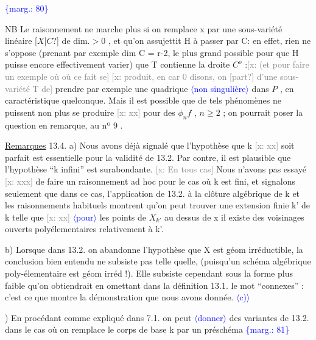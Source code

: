 \documentclass[11pt]{article}
\newcommand{\scanpage}[1]{\par\bigskip\noindent{\small\sffamily[scan #1]}\par}
\newcommand{\mspage}[1]{{\small\sffamily[p.\,#1]}}
\newcommand{\hand}[1]{\textcolor{blue}{#1}}
\let\over\relax
\newcommand{\over}[2]{\textcolor{gray}{#1}\textcolor{blue}{\ensuremath{^{\!\nearrow}}#2}}
\newcommand{\inserted}[2][]{\textcolor{blue}{$\langle$#2$\rangle$}}
\newcommand{\margin}[1]{\textcolor{blue}{\{\textsf{marg.:} #1\}}}
\newcommand{\xout}[1]{\textcolor{gray}{[\textsf{x:} #1]}}
\newcommand{\uline}[1]{\underline{#1}}
\newcommand{\unsure}[1]{[#1?]}
\begin{document}
\margin{80}

\clearpage
\scanpage{25/81}
\mspage{\hand{76}}

NB \quad Le raisonnement ne marche plus si on remplace x par une
sous-variété linéaire \unsure{$X$|$C$} de dim.$>0$ , et qu'on assujettit H à passer
par C: en effet, rien ne s'oppose (prenant par exemple dim C = r-2, le
plus grand possible pour que H puisse encore effectivement varier) que
T contienne la droite $C^{o}$ :\xout{(et pour faire un exemple où où ce fait se}
\xout{produit, en car 0 disons, on \unsure{part} d'une sous-variété T de} prendre par
exemple une quadrique \inserted{non singulière} dans $P$ , en caractéristique quelconque. Mais il
est possible que de tels phénomènes ne puissent non plus se produire \xout{xx}
pour des $\phi_n f$ , $n\geq 2$ ; on pourrait poser la question en remarque, au
nº 9 .

\uline{Remarques} 13.4. \quad a) Nous avons déjà signalé que l'hypothèse que k \xout{xx}
soit parfait est essentielle pour la validité de 13.2. Par contre, il
est plausible que l'hypothèse ``k infini'' est surabondante. \xout{En tous cas}
Nous n'avons pas essayé \xout{xxx} de faire un raisonnement ad hoc pour le cas
où k est fini, et signalons seulement que dans ce cas, l'application de
13.2. à la clôture algébrique de k et les raisonnements habituels
montrent qu'on peut trouver une extension finie k' de k telle que
\xout{xx} \inserted{pour} les points de $X_{k'}$ au dessus de x il existe des voisinages ouverts
polyélementaires relativement à k'.

b) Lorsque dans 13.2. on abandonne l'hypothèse que X est géom
irréductible, la conclusion bien entendu ne subsiste pas telle quelle,
(puisqu'un schéma algébrique poly-élementaire est géom irréd !). Elle
subsiste cependant sous la forme plus faible qu'on obtiendrait en
omettant dans la définition 13.1. le mot ``connexes'' : c'est ce que
montre la démonstration que nous avons donnée.
\inserted{c)}

\over{c}{d}) En procédant comme expliqué dans 7.1. on peut \inserted{donner} des variantes
de 13.2. dans le cas où on remplace le corps de base k par un préschéma
\margin{81}

\clearpage
\scanpage{25/82}
\mspage{\hand{77}}
\end{document}
